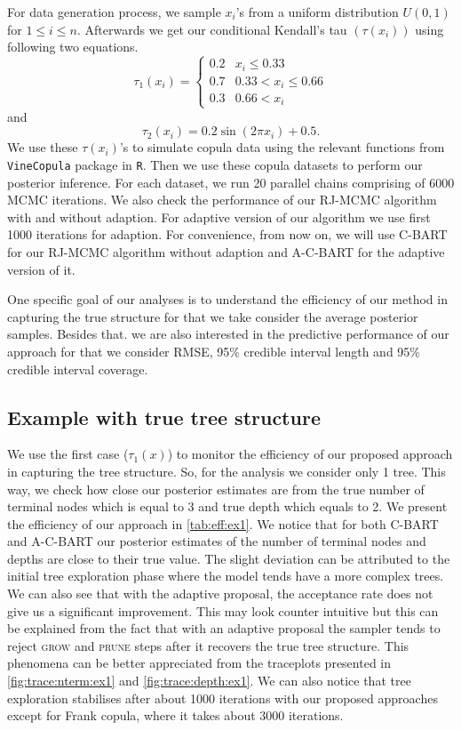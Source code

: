 \documentclass{amsart}
\begin{document}
For data generation process, we sample $x_i$'s from a uniform distribution $U(0,1)$ for $1\le i\le n$. Afterwards we get our conditional Kendall's tau $(\tau(x_i))$ using following two equations.
\begin{equation}\label{eq:tree:tau}
	\tau_1(x_i) = \begin{cases}
		0.2 & x_i \le 0.33\\
		0.7 & 0.33 < x_i \le 0.66\\
		0.3 & 0.66 < x_i
	\end{cases}
\end{equation}
and
\begin{equation}\label{eq:sin:tau}
	\tau_2(x_i) = 0.2\sin(2\pi x_i) + 0.5.
\end{equation}
We use these $\tau(x_i)$'s to simulate copula data using the relevant functions from \texttt{VineCopula} package in \texttt{R}. Then we use these copula datasets to perform our posterior inference. For each dataset, we run 20 parallel chains comprising of 6000 MCMC iterations. We also check the performance of our RJ-MCMC algorithm with and without adaption. For adaptive version of our algorithm we use first 1000 iterations for adaption. For convenience, from now on, we will use C-BART for our RJ-MCMC algorithm without adaption and A-C-BART for the adaptive version of it.

One specific goal of our analyses is to understand the efficiency of our method in capturing the true structure for that we take consider the average posterior samples. Besides that. we are also interested in the predictive performance of our approach for that we consider RMSE, 95\% credible interval length and 95\% credible interval coverage. 

\subsection{Example with true tree structure} 

We use the first case ($\tau_1(x)$) to monitor the efficiency of our proposed approach in capturing the tree structure. So, for the analysis we consider only 1 tree. This way, we check how close our posterior estimates are from the true number of terminal nodes which is equal to 3 and true depth which equals to 2. We present the efficiency of our approach in \cref{tab:eff:ex1}. We notice that for both C-BART and A-C-BART our posterior estimates of the number of terminal nodes and depths are close to their true value. The slight deviation can be attributed to the initial tree exploration phase where the model tends have a more complex trees. We can also see that with the adaptive proposal, the acceptance rate does not give us a significant improvement. This may look counter intuitive but this can be explained from the fact that with an adaptive proposal the sampler tends to reject \textsc{grow} and \textsc{prune} steps after it recovers the true tree structure. This phenomena can be better appreciated from the traceplots presented in \cref{fig:trace:nterm:ex1} and \cref{fig:trace:depth:ex1}. We can also notice that tree exploration stabilises after about 1000 iterations with our proposed approaches except for Frank copula, where it takes about 3000 iterations. 
\end{document}
